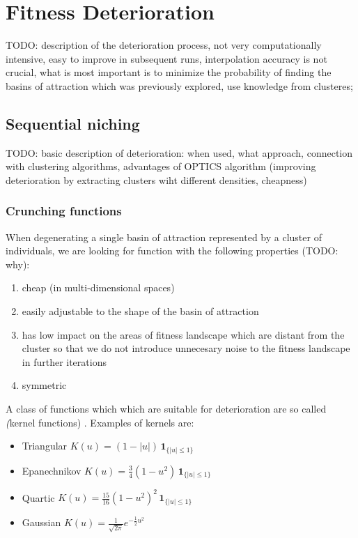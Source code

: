 

\chapter{Fitness Deterioration}
\label{FitnessDeterioration}

TODO: description of the deterioration process,
not very computationally intensive,
easy to improve in subsequent runs,
interpolation accuracy is not crucial, what is most important is to
minimize the probability of finding the basins of attraction which was
previously explored,
use knowledge from clusteres;

 
\section{Sequential niching}

TODO: basic description of deterioration: 
when used, what approach,
connection with clustering algorithms,
advantages of OPTICS algorithm (improving deterioration by extracting clusters
wiht different densities, cheapness)

\subsection{Crunching functions}
When degenerating a single basin of attraction represented by a cluster of
individuals, we are looking for function with the following properties (TODO:
why):
\begin{enumerate}
  \item cheap (in multi-dimensional spaces)
  \item easily adjustable to the shape of the basin of attraction
  \item has low impact on the areas of fitness landscape which are distant from
  the cluster so that we do not introduce unnecesary noise to the fitness landscape
  in further iterations
  \item symmetric
\end{enumerate}

A class of functions which which are suitable for deterioration are so called
\textit(kernel functions) \cite{kernel}. Examples of kernels are: 
\begin{itemize}
  \item Triangular 	$K(u) = (1-|u|) \,\mathbf{1}_{\{|u|\leq1\}}$
  \item Epanechnikov 	$K(u) = \frac{3}{4}(1-u^2) \,\mathbf{1}_{\{|u|\leq1\}}$
  \item Quartic  $K(u) = \frac{15}{16}(1-u^2)^2 \,\mathbf{1}_{\{|u|\leq1\}}$
  \item Gaussian 	$K(u) = \frac{1}{\sqrt{2\pi}}e^{-\frac{1}{2}u^2}$
\end{itemize}

